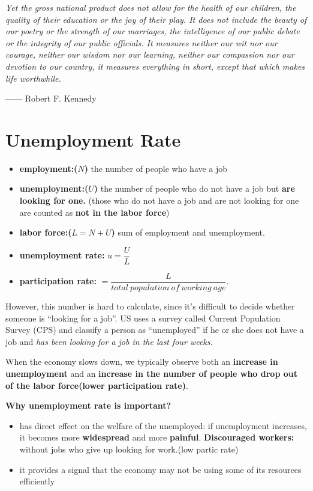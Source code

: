 \documentclass[11pt, a4paper]{ECON2123}
\begin{document}
\begin{spacing}{1.5}
    {\it Yet the gross national product does not allow for the health of 
    our children, the quality of their education or the joy of their play. 
    It does not include the beauty of our poetry or the strength of our marriages, 
    the intelligence of our public debate or the integrity of our public officials. 
    It measures neither our wit nor our courage, neither our wisdom nor our learning, 
    neither our compassion nor our devotion to our country, it measures everything 
    in short, except that which makes life worthwhile.}
    \begin{flushright}
        —— Robert F. Kennedy
    \end{flushright}

    \section{Unemployment Rate}

    \begin{itemize}
        \item {\bf employment:($N$) } the number of people who have a job
        \item {\bf unemployment:($U$) } the number of people who do not 
        have a job but {\bf are looking for one.} (those who do not have a 
        job and are not looking for one are counted as {\bf not in the labor force})
        \item {\bf labor force:($L=N+U$) } sum of employment and unemployment.
        \item {\bf unemployment rate: } $u=\dfrac{U}{L}$
        \item {\bf participation rate: } 
        $=\dfrac{L}{total\ population\ of\ working\ age}$.
    \end{itemize}

    However, this number is hard to calculate, since it's difficult
    to decide whether someone is ``looking for a job''.
    US uses a survey called Current Population Survey (CPS) 
    and classify a person as ``unemployed'' if he or she does not 
    have a job and {\it has been looking for a job in the last four weeks.}

    When the economy slows down, we typically observe both an 
    {\bf increase in unemployment} and an {\bf increase in the number of people 
    who drop out of the labor force(lower participation rate)}. 

    {\bf Why unemployment rate is important?}
    \begin{itemize}
        \item has direct effect on the welfare of the unemployed: 
        if unemployment increases, it becomes more {\bf widespread} 
        and more {\bf painful}.
        {\bf Discouraged workers: } without jobs who give up looking 
        for work.(low partic rate)
        \item it provides a signal that the economy may not be 
        using some of its resources efficiently
    \end{itemize}


\end{spacing}
\end{document}
